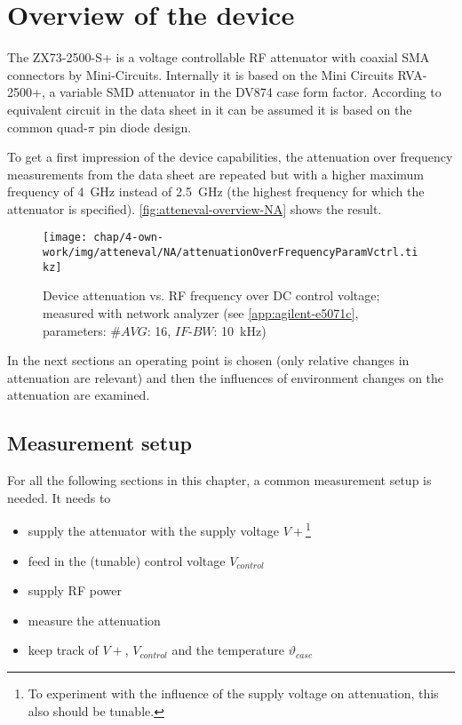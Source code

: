 \FloatBarrier
\section{Overview of the device}
The ZX73-2500-S+ is a voltage controllable RF attenuator with coaxial SMA connectors by Mini-Circuits. Internally it is based on the Mini Circuits RVA-2500+, a variable SMD attenuator in the DV874 case form factor. According to equivalent circuit in the data sheet in \cite{mini-circuitsZX732500VoltageVariable} it can be assumed it is based on the common quad-$\pi$ pin diode design\cite{waughLowCostSurfaceMount1992}.

To get a first impression of the device capabilities, the attenuation over frequency measurements from the data sheet are repeated but with a higher maximum frequency of \SI{4}{\GHz} instead of \SI{2.5}{\GHz} (the highest frequency for which the attenuator is specified). \autoref{fig:atteneval-overview-NA} shows the result.

\begin{figure}[tb]
	\centering
	\texttt{[image: chap/4-own-work/img/atteneval/NA/attenuationOverFrequencyParamVctrl.tikz]}
	\caption{Device attenuation vs. RF frequency over DC control voltage;\\ measured with network analyzer (see \ref{app:agilent-e5071c}, parameters: $\#AVG$: 16, $IF\text{-}BW$: \SI{10}{\kHz})}
	\label{fig:atteneval-overview-NA}
\end{figure}

In the next sections an operating point is chosen (only relative changes in attenuation are relevant) and then the influences of environment changes on the attenuation are examined.

\FloatBarrier
\subsection{Measurement setup}
For all the following sections in this chapter, a common measurement setup is needed. It needs to
\begin{itemize}
\item supply the attenuator with the supply voltage $V+$\footnote{To experiment with the influence of the supply voltage on attenuation, this also should be tunable.}
\item feed in the (tunable) control voltage $V_{control}$
\item supply RF power
\item measure the attenuation
\item keep track of $V+$, $V_{control}$ and the temperature $\vartheta_{case}$
\end{itemize}

